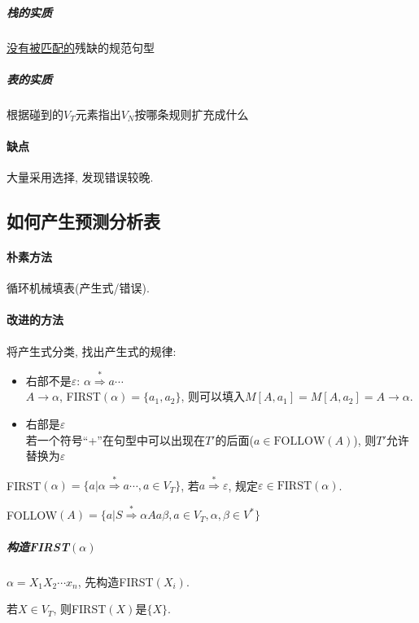                 \subparagraph{栈的实质} \underline{没有被匹配的}残缺的规范句型
                
                \subparagraph{表的实质} 根据碰到的$V_T$元素指出$V_N$按哪条规则扩充成什么

            \paragraph{缺点} 大量采用选择, 发现错误较晚.

        \subsection{如何产生预测分析表}

            \paragraph{朴素方法} 循环机械填表(产生式/错误).

            \paragraph{改进的方法} 将产生式分类, 找出产生式的规律:
                \begin{itemize}
                    \item 右部不是$\varepsilon$: $\alpha\stackrel{*}{\Rightarrow}a\cdots$\\
                        $A\to \alpha$, FIRST$(\alpha)=\{a_1,a_2\}$, 则可以填入$M[A,a_1]=M[A,a_2]=A\to\alpha$.
                    \item 右部是$\varepsilon$ \\
                        若一个符号``+''在句型中可以出现在$T'$的后面($a\in\mathrm{FOLLOW}(A)$), 则$T'$允许替换为$\varepsilon$
                \end{itemize}

                FIRST$(\alpha)=\{a|\alpha\stackrel{*}{\Rightarrow}a\cdots, a\in V_T\}$, 若$a\stackrel{*}{\Rightarrow}\varepsilon$, 规定$\varepsilon\in\mathrm{FIRST}(\alpha)$.

                FOLLOW$(A)=\{a|S\stackrel{*}{\Rightarrow}\alpha Aa\beta, a\in V_T, \alpha, \beta\in V^*\}$

                \subparagraph{构造FIRST$(\alpha)$}

                    $\alpha=X_1X_2\cdots x_n$, 先构造FIRST$(X_i)$.

                    若$X\in V_T$, 则FIRST$(X)$是$\{X\}$. 
                    
